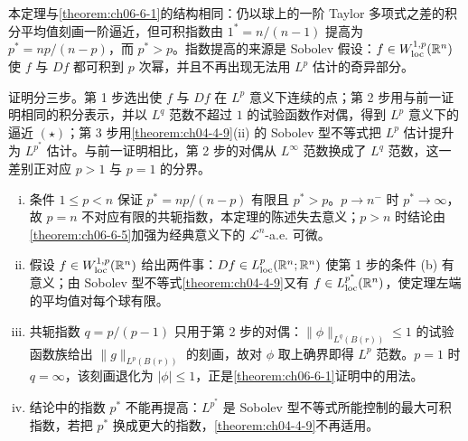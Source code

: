 \documentclass[../../main.tex]{subfiles}%
\begin{document}
\begin{remark}\label{remark:ch06-thm-6-2-动机}
本定理与\cref{theorem:ch06-6-1}的结构相同：仍以球上的一阶 Taylor 多项式之差的积分平均值刻画一阶逼近，但可积指数由 $1^{*}=n/(n-1)$ 提高为 $p^{*}=np/(n-p)$，而 $p^{*}>p$。指数提高的来源是 Sobolev 假设：$f\in W^{1,p}_{\mathrm{loc}}(\mathbb{R}^n)$ 使 $f$ 与 $Df$ 都可积到 $p$ 次幂，并且不再出现无法用 $L^p$ 估计的奇异部分。%

证明分三步。第 1 步选出使 $f$ 与 $Df$ 在 $L^p$ 意义下连续的点；第 2 步用与前一证明相同的积分表示，并以 $L^{q}$ 范数不超过 $1$ 的试验函数作对偶，得到 $L^p$ 意义下的逼近 $(\star)$；第 3 步用\cref{theorem:ch04-4-9}(ii) 的 Sobolev 型不等式把 $L^p$ 估计提升为 $L^{p^{*}}$ 估计。与前一证明相比，第 2 步的对偶从 $L^{\infty}$ 范数换成了 $L^{q}$ 范数，这一差别正对应 $p>1$ 与 $p=1$ 的分界。%
\end{remark}

\begin{remark}\label{remark:ch06-thm-6-2-条件}
\begin{enumerate}[(i)]
\item 条件 $1\leqslant p<n$ 保证 $p^{*}=np/(n-p)$ 有限且 $p^{*}>p$。$p\to n^{-}$ 时 $p^{*}\to\infty$，故 $p=n$ 不对应有限的共轭指数，本定理的陈述失去意义；$p>n$ 时结论由\cref{theorem:ch06-6-5}加强为经典意义下的 $\mathcal{L}^n$-a.e. 可微。%
\item 假设 $f\in W^{1,p}_{\mathrm{loc}}(\mathbb{R}^n)$ 给出两件事：$Df\in L^p_{\mathrm{loc}}(\mathbb{R}^n;\mathbb{R}^n)$ 使第 1 步的条件 (b) 有意义；由 Sobolev 型不等式\cref{theorem:ch04-4-9}又有 $f\in L^{p^{*}}_{\mathrm{loc}}(\mathbb{R}^n)$，使定理左端的平均值对每个球有限。%
\item 共轭指数 $q=p/(p-1)$ 只用于第 2 步的对偶：$\lVert\phi\rVert_{L^{q}(B(r))}\leqslant1$ 的试验函数族给出 $\lVert g\rVert_{L^{p}(B(r))}$ 的刻画，故对 $\phi$ 取上确界即得 $L^p$ 范数。$p=1$ 时 $q=\infty$，该刻画退化为 $\lvert\phi\rvert\leqslant1$，正是\cref{theorem:ch06-6-1}证明中的用法。%
\item 结论中的指数 $p^{*}$ 不能再提高：$L^{p^{*}}$ 是 Sobolev 型不等式所能控制的最大可积指数，若把 $p^{*}$ 换成更大的指数，\cref{theorem:ch04-4-9}不再适用。%
\end{enumerate}
\end{remark}
\end{document}
